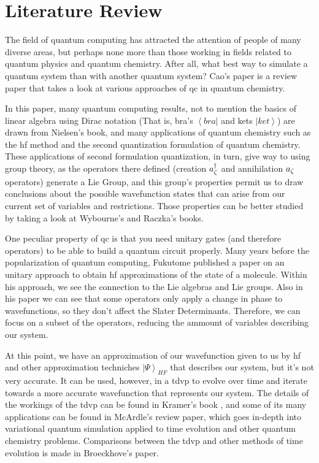 \documentclass{aux/ttuthes2007}
\newcommand{\bra}[1]{\ensuremath{\left\langle#1\right\vert}}
\newcommand{\ket}[1]{\ensuremath{\left|#1\right\rangle}}
\newcommand{\anig}[1]{a_{\go{#1}}}
\newcommand{\creg}[1]{a^\dagger_{\go{#1}}}
\newcommand{\go}[1]{
		\IfEqCase{#1}{
			{0}{\zeta}
			{1}{\eta}
			{2}{\iota}
			{3}{\kappa}
		}[\PackageError{unocorb}{Undefined option to go: #1}{}]
}
\begin{document}
\chapter{\textbf{Literature Review}}\label{chap:literature}
The field of quantum computing has attracted the attention of people of many diverse areas, but perhaps none more than those working in fields related to quantum physics and quantum chemistry. After all, what best way to simulate a quantum system than with another quantum system? Cao's paper  is a review paper that takes a look at various approaches of \gls{qc} in quantum chemistry.

	In this paper, many quantum computing results, not to mention the basics of linear algebra using Dirac notation (That is, bra's $\bra {bra}$ and kets $\ket{ket}$) are drawn from Nielsen's book\cite{nielsen}, and many applications of quantum chemistry such as the \gls{hf} method and the second quantization formulation of quantum chemistry.
	These applications of second formulation quantization, in turn, give way to using group theory, as the operators there defined (creation $\creg 0$ and annihilation $\anig 0$ operators) generate a Lie Group, and this group's properties permit us to draw conclusions about the possible wavefunction states that can arise from our current set of variables and restrictions. Those properties can be better studied by taking a look at Wybourne's  and Raczka's  books.
	
	One peculiar property of \gls{qc} is that you need unitary gates (and therefore operators) to be able to build a quantum circuit properly. Many years before the popularization of quantum computing, Fukutome  published a paper on an unitary approach to obtain \gls{hf} approximations of the state of a molecule. Within his approach, we see the connection to the Lie algebras and Lie groups. Also in his paper we can see that some operators only apply a change in phase to wavefunctions, so they don't affect the Slater Determinants. Therefore, we can focus on a subset of the operators, reducing the ammount of variables describing our system.

	At this point, we have an approximation of our wavefunction given to us by \gls{hf} and other approximation techniches $\ket\Psi_{HF}$ that describes our system, but it's not very accurate. It can be used, however, in a \gls{tdvp} to evolve over time and iterate towards a more accurate wavefunction that represents our system. The details of the workings of the \gls{tdvp} can be found in Kramer's book , and some of its many applications can be found in McArdle's  review paper, which goes in-depth into variational quantum simulation applied to time evolution and other quantum chemistry problems. Comparisons between the \gls{tdvp} and other methods of time evolution is made in Broeckhove's  paper.
\end{document}
